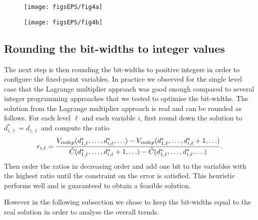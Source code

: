 \begin{figure}[h]
\centering
\begin{minipage}{.48\textwidth}
  \texttt{[image: figsEPS/fig4a]}
  \label{fig:optimal_bw}
\end{minipage}%
\hspace{.02\textwidth}
\begin{minipage}{.48\textwidth}
  \texttt{[image: figsEPS/fig4b]}
  \label{fig:cost_comparison}
\end{minipage}
\end{figure}


\subsection{Rounding the bit-widths to integer values}
The next step is then rounding the bit-widths to positive integers in order to configure the fixed-point variables. In practice we observed for the single level case that the Lagrange multiplier approach was good enough compared to several integer programming approaches that we tested to optimise the bit-widths. The solution from the Lagrange multiplier approach is real and can be rounded as follows. For each level $\ell$ and each variable $i$, first round down the solution to $d^*_{i,\ell} = d_{i,\ell}$ and compute the ratio
\begin{equation}
    r_{i,\ell} = \frac{V_{indep}(d^*_{1,\ell}, \ldots, d^*_{i,\ell}, \ldots)-V_{indep}(d^*_{1,\ell}, \ldots, d^*_{i,\ell}+1, \ldots)}{\Tilde{C}(d^*_{1,\ell}, \ldots, d^*_{i,\ell}+1, \ldots)-\Tilde{C}(d^*_{1,\ell}, \ldots, d^*_{i,\ell}, \ldots)}. 
    \label{eq:ratio_lagr}
\end{equation}
Then order the ratios in decreasing order and add one bit to the variables with the highest ratio until the constraint on the error is satisfied. This heuristic performs well and is guaranteed to obtain a feasible solution.

However in the following subsection we chose to keep the bit-widths equal to the real solution in order to analyse the overall trends.



